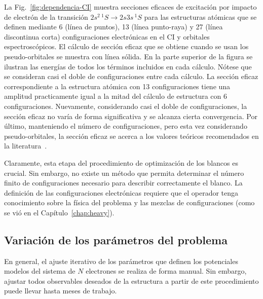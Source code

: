 La Fig.~\ref{fig:dependencia-CI} muestra secciones eficaces de 
excitación por impacto de electrón de la transición 
$2s^2\,^1S\rightarrow 2s3s\,^1S$ para las estructuras atómicas que se 
definen mediante 6 (línea de puntos), 13 (línea punto-raya) y 27 (línea 
discontinua corta) configuraciones electrónicas en el CI y orbitales
espectroscópicos. El cálculo de sección eficaz que se obtiene cuando se 
usan los pseudo-orbitales se muestra con línea sólida. En la parte 
superior de la figura se ilustran las energías de todos los términos 
incluidos en cada cálculo. 
Nótese que se consideran casi el doble de configuraciones entre cada 
cálculo. La sección eficaz correspondiente a la estructura atómica con 
13 configuraciones tiene una amplitud practicamente igual a la mitad del
cálculo de estructura con 6 configuraciones. Nuevamente, considerando 
casi el doble de configuraciones, la sección eficaz no varía de forma 
significativa y se alcanza cierta convergencia. Por último, manteniendo 
el número de configuraciones, pero esta vez considerando 
pseudo-orbitales, la sección eficaz se acerca a los valores teóricos 
recomendados en la literatura~\cite{Dipti:19}.

Claramente, esta etapa del procedimiento de optimización de los blancos
es crucial. Sin embargo, no existe un método que permita determinar el 
número finito de configuraciones necesario para describir correctamente 
el blanco. La definición de las configuraciones electrónicas requiere 
que el operador tenga conocimiento sobre la física del problema y las 
mezclas de configuraciones (como se vió en el Capítulo~\ref{chap:heavy}). 

\subsection{Variación de los parámetros del problema}
\label{sec:powell}

En general, el ajuste iterativo de los parámetros que definen los 
potenciales modelos del sistema de $N$ electrones se realiza de forma 
manual. Sin embargo, ajustar todos observables deseados de la estructura 
a partir de este procedimiento puede llevar hasta meses de trabajo. 

